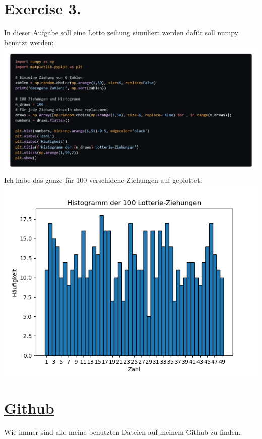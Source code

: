 \documentclass{scrartcl}
\begin{document}
\section*{Exercise 3.}
In dieser Aufgabe soll eine Lotto zeihung simuliert werden dafür soll numpy benutzt werden:\\
\includegraphics*[scale=0.24]{lottery_py_code.png}\\
Ich habe das ganze für 100 verschidene Ziehungen auf geplottet:\\
\includegraphics*[scale=0.6]{lotery.png}



\section*{\href{https://github.com/7hands/Angewandte-Modellierung-25-Colmant}{Github}}
Wie immer sind alle meine benutzten Dateien auf meinem Github zu finden. 
\end{document}
